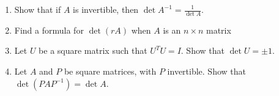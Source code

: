 \documentclass[12pt]{article}
\begin{document}
\begin{multicols*}{2}
\begin{enumerate}
		\item Show that if $A$ is invertible, then $\det A^{-1} = \frac{1}{\det A}$.
		\vfill
		\item Find a formula for $\det (rA)$ when $A$ is an $n\times n$ matrix
		\vfill
		\item Let $U$ be a square matrix such that $U^TU = I$. Show that $\det U = \pm 1$.
		\vfill
		\item Let $A$ and $P$ be square matrices, with $P$ invertible. Show that $\det(PAP^{-1}) = \det A$.
		\vfill
	\end{enumerate}
\end{multicols*}
\end{document}
